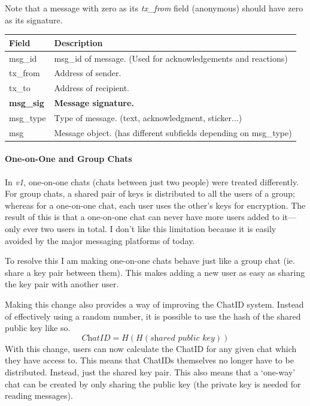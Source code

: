 \documentclass{article}
\begin{document}
Note that a message with zero as its \textit{tx\_from} field (anonymous) should have zero as its signature.

\begin{table}[H]
\centering
\begin{tabular}{|p{2.5cm}|p{8.5cm}|}
\hline
\rowcolor{tblgrey}
Field & Description\\ \hline
msg\_id     & msg\_id of message. (Used for acknowledgements and reactions)\\ \hline
tx\_from    & Address of sender.                       \\ \hline
tx\_to      & Address of recipient.                                        \\ \hline
\textbf{msg\_sig}    & \textbf{Message signature.}                             \\ \hline
msg\_type   & Type of message. (text, acknowledgment, sticker...)          \\ \hline
msg         & Message object. (has different subfields depending on msg\_type) \\ \hline
\end{tabular}
\end{table}



\paragraph{One-on-One and Group Chats}
In \textit{v1}, one-on-one chats (chats between just two people) were treated differently. For group chats, a shared pair of keys is distributed to all the users of a group; whereas for a one-on-one chat, each user uses the other's keys for encryption. The result of this is that a one-on-one chat can never have more users added to it---only ever two users in total. I don't like this limitation because it is easily avoided by the major messaging platforms of today.

To resolve this I am making one-on-one chats behave just like a group chat (ie. share a key pair between them). This makes adding a new user as easy as sharing the key pair with another user.

Making this change also provides a way of improving the ChatID system. Instead of effectively using a random number, it is possible to use the hash of the shared public key like so.
\[ \textit{ChatID} = H(H(\textit{shared public key})) \]
With this change, users can now calculate the ChatID for any given chat which they have access to. This means that ChatIDs themselves no longer have to be distributed. Instead, just the shared key pair. This also means that a `one-way' chat can be created by only sharing the public key (the private key is needed for reading messages).
\end{document}
